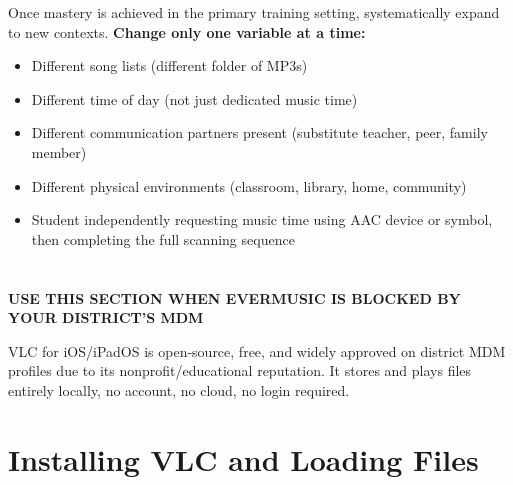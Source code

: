 \documentclass[justified,openright]{tufte-book}
\begin{document}

Once mastery is achieved in the primary training setting, systematically
expand to new contexts. \textbf{Change only one variable at a time:}

\begin{itemize}

\item
  Different song lists (different folder of MP3s)
\item
  Different time of day (not just dedicated music time)
\item
  Different communication partners present (substitute teacher, peer,
  family member)
\item
  Different physical environments (classroom, library, home, community)
\item
  Student independently requesting music time using AAC device or
  symbol, then completing the full scanning sequence
\end{itemize}

\section{\texorpdfstring{}{VLC alternate configuration}}
\label{section-5-vlc-alternate-configuration}



\textbf{USE THIS SECTION WHEN EVERMUSIC IS BLOCKED BY YOUR DISTRICT'S
MDM}

VLC for iOS/iPadOS is open-source, free, and widely approved on district
MDM profiles due to its nonprofit/educational reputation. It stores and
plays files entirely locally, no account, no cloud, no login
required.


\section{Installing VLC and Loading
Files}\label{installing-vlc-and-loading-files}
\end{document}
